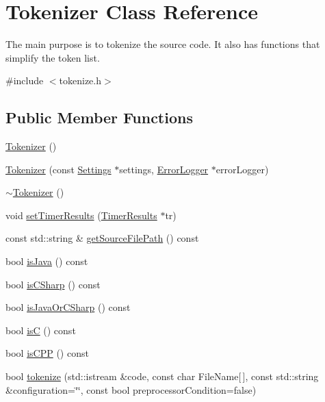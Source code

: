 \hypertarget{class_tokenizer}{\section{Tokenizer Class Reference}
\label{class_tokenizer}
}


The main purpose is to tokenize the source code. It also has functions that simplify the token list.  




{\ttfamily \#include $<$tokenize.\-h$>$}

\subsection*{Public Member Functions}
\begin{DoxyCompactItemize}
\item 
\hyperlink{class_tokenizer_a2a6c04ea8c784f66bebcb6df7073769c}{Tokenizer} ()
\item 
\hyperlink{class_tokenizer_afbed747031f3829396c645086d2d72ab}{Tokenizer} (const \hyperlink{class_settings}{Settings} $\ast$settings, \hyperlink{class_error_logger}{Error\-Logger} $\ast$error\-Logger)
\item 
\hyperlink{class_tokenizer_a3f60f887953edf0f95ba5f36102f7017}{$\sim$\-Tokenizer} ()
\item 
void \hyperlink{class_tokenizer_ac041ef803ed51ea595979f15ecab1188}{set\-Timer\-Results} (\hyperlink{class_timer_results}{Timer\-Results} $\ast$tr)
\item 
const std\-::string \& \hyperlink{class_tokenizer_adda47beabaa72ae16c687ae1294776d8}{get\-Source\-File\-Path} () const 
\item 
bool \hyperlink{class_tokenizer_aea9d49a9c8d200059d04fddea09fdeea}{is\-Java} () const 
\item 
bool \hyperlink{class_tokenizer_ae6d8a7a1b0898f13fb68dad35463590e}{is\-C\-Sharp} () const 
\item 
bool \hyperlink{class_tokenizer_a3e61fb17ee95420392506ab1d6f767bb}{is\-Java\-Or\-C\-Sharp} () const 
\item 
bool \hyperlink{class_tokenizer_a3e2a6df2dd3275efe39586965f301c26}{is\-C} () const 
\item 
bool \hyperlink{class_tokenizer_a4c9ff98aae71170776600666ea5baf4b}{is\-C\-P\-P} () const 
\item 
bool \hyperlink{class_tokenizer_abb907db1cec9bcf665f7d2af04343050}{tokenize} (std\-::istream \&code, const char File\-Name\mbox{[}$\,$\mbox{]}, const std\-::string \&configuration=\char`\"{}\char`\"{}, const bool preprocessor\-Condition=false)

\end{DoxyCompactItemize}

